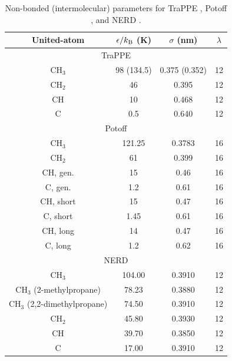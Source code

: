 \documentclass[journal=jced,manuscript=article]{achemso}
\begin{document}
    \begin{table}[h!]
		\caption{Non-bonded (intermolecular) parameters for TraPPE \cite{TraPPE,Martin1999}, Potoff \cite{Mie,Potoff_branched}, and NERD \cite{NERD}.} \label{tab:nonbonded params}
		\begin{center}
			\begin{tabular}{|c|c|c|c|}
				\hline
				United-atom & $\epsilon/k_{\rm B}$ (K) & $\sigma$ (nm) & $\lambda$ \\ \hline
				\multicolumn{4}{|c|}{TraPPE} \\ \hline
				CH$_3$ & 98 (134.5)  & 0.375 (0.352) & 12 \\ 
				CH$_2$ & 46 & 0.395 & 12\\ 
				CH & 10 & 0.468 & 12 \\
				C & 0.5 & 0.640 & 12 \\
				\hline
				\multicolumn{4}{|c|}{Potoff} \\ \hline
				CH$_3$ & 121.25 & 0.3783 & 16  \\ 
				CH$_2$ & 61 & 0.399 & 16 \\ 
				CH, gen. & 15 & 0.46 & 16\\
				C, gen. & 1.2 & 0.61 & 16\\
				CH, short & 15 & 0.47 & 16\\
				C, short & 1.45 & 0.61 & 16\\
				CH, long & 14 & 0.47 & 16\\
				C, long & 1.2 & 0.62 & 16\\
				\hline
                \multicolumn{4}{|c|}{NERD} \\ \hline
				CH$_3$ & 104.00  & 0.3910 & 12\\ 
				CH$_3$ (2-methylpropane) & 78.23  & 0.3880 & 12\\ 
				CH$_3$ (2,2-dimethylpropane) & 74.50  & 0.3910 & 12 \\  
				CH$_2$ & 45.80 & 0.3930 & 12 \\ 
				CH & 39.70 & 0.3850 & 12\\
				C & 17.00 & 0.3910 & 12 \\
				\hline
			\end{tabular}
		\end{center} 
	\end{table}
    
\end{document}
